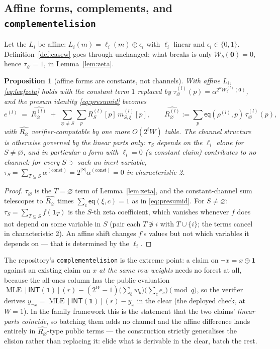 \documentclass[11pt]{article}
\newcommand{\bits}{\{0,1\}}
\newcommand{\INT}{\mathsf{INT}}
\newcommand{\eq}{\mathsf{eq}}
\newcommand{\Wc}{\mathcal{W}}          %
\DeclareRobustCommand{\code}[1]{{\def\_{\textunderscore\allowbreak}\texttt{#1}}}
\DeclareMathOperator{\MLE}{MLE}
\theoremstyle{plain}
\newtheorem{proposition}[theorem]{Proposition}
\theoremstyle{definition}
\theoremstyle{remark}
\begin{document}
\subsection{Affine forms, complements, and
\texorpdfstring{\code{complement\_elision}}{complement\_elision}}\label{sec:affine}

Let the $L_i$ be affine: $L_i(m)=\ell_i(m)\oplus\epsilon_i$ with $\ell_i$
linear and $\epsilon_i\in\bits$. Definition~\ref{def:casew} goes through
unchanged; what breaks is only $\Wc_b(\mathbf 0)=0$, hence
$\tau_\varnothing=1$, in Lemma~\ref{lem:zeta}.

\begin{proposition}[affine forms are constants, not channels]\label{prop:affine}
With affine $L_i$, \eqref{eq:leafzeta} holds with the constant term $1$
replaced by $\tau^{(l)}_\varnothing(p)=\alpha^{2^{\omega}\Wc^{(l)}_b(\mathbf 0)}$,
and the presum identity \eqref{eq:presumid} becomes
\[
  e^{(l)} \;=\; \widehat{R^{(l)}_\varnothing}
  \;+\; \sum_{\varnothing\ne S}\sum_p R^{(l)}_S[p]\,m^{(l)}_{S,\xi}[p],
  \qquad
  \widehat{R^{(l)}_\varnothing}
   := \sum_p \eq(\rho^{(l)},p)\,\tau^{(l)}_\varnothing(p),
\]
with $\widehat{R_\varnothing}$ verifier-computable by one more $O(2^tW)$
table. The channel structure is otherwise governed by the \emph{linear parts}
only: $\tau_S$ depends on the $\ell_i$ alone for $S\neq\varnothing$, and in
particular a form with $\ell_i=0$ (a constant claim) contributes to no
channel: for every $S\ni$ such an inert variable,
$\tau_S=\sum_{T\subseteq S}\alpha^{(\mathrm{const})}=2^{|S|}\alpha^{(\mathrm{const})}=0$
in characteristic 2.
\end{proposition}

\begin{proof}
$\tau_\varnothing$ is the $T=\varnothing$ term of Lemma~\ref{lem:zeta}, and
the constant-channel sum telescopes to $\widehat{R_\varnothing}$ times
$\sum_c\eq(\xi,c)=1$ as in \eqref{eq:presumid}. For $S\ne\varnothing$:
$\tau_S=\sum_{T\subseteq S}f(\mathbf1_T)$ is the $S$-th zeta coefficient,
which vanishes whenever $f$ does not depend on some variable in $S$
(pair each $T\not\ni i$ with $T\cup\{i\}$; the terms cancel in
characteristic 2). An affine shift changes $f$'s values but not which
variables it depends on --- that is determined by the $\ell_i$.
\end{proof}

The repository's \code{complement\_elision} is the extreme point: a claim on
$\lnot x = x\oplus\mathbf 1$ against an existing claim on $x$ \emph{at the
same row weights} needs no forest at all, because the all-ones column has the
public evaluation
$\MLE[\INT(\mathbf 1)](r) \equiv
(2^{W}-1)\bigl(\sum_b w_b\bigr)\bigl(\sum_c e_c\bigr) \pmod q$,
so the verifier derives $y_{\lnot x} = \MLE[\INT(\mathbf 1)](r) - y_x$ in the
clear (the deployed check, at $W=1$). In the family framework this is the statement
that the two claims' \emph{linear parts coincide}, so batching them adds no
channel and the affine difference lands entirely in
$\widehat{R_\varnothing}$-type public terms --- the construction strictly
generalises the elision rather than replacing it: elide what is derivable in
the clear, batch the rest.
\end{document}
